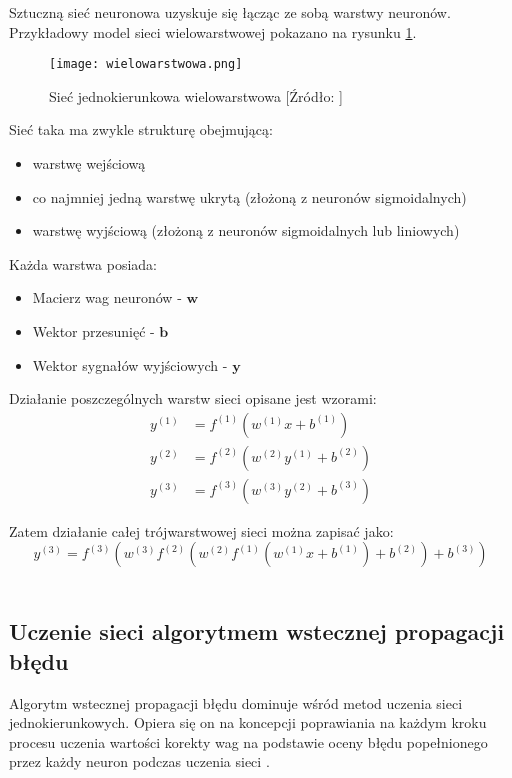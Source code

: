 \documentclass[12pt,twoside]{article}
\begin{document}
Sztuczną sieć neuronowa uzyskuje się łącząc ze sobą warstwy neuronów. Przykładowy model sieci wielowarstwowej pokazano na rysunku \ref{wielo}.

\begin{figure}[h]
\label{wielo}
\centering
\texttt{[image: wielowarstwowa.png]}
\caption{Sieć jednokierunkowa wielowarstwowa	[Źródło: \cite{zajdel1}]}
\end{figure}

Sieć taka ma zwykle strukturę obejmującą: 
\begin{itemize}
\item warstwę wejściową
\item co najmniej jedną warstwę ukrytą (złożoną z neuronów sigmoidalnych)
\item warstwę wyjściową (złożoną z neuronów sigmoidalnych lub liniowych)
\end{itemize}

Każda warstwa posiada:
\begin{itemize}
\item Macierz wag neuronów - $\textbf{w}$
\item Wektor przesunięć - $\textbf{b}$
\item Wektor sygnałów wyjściowych - $\textbf{y}$
\end{itemize}

Działanie poszczególnych warstw sieci opisane jest wzorami:
\begin{equation}\label{warstwy}
\begin{aligned}
y^{(1)} &= f^{(1)}(w^{(1)}x + b^{(1)})\\
y^{(2)} &= f^{(2)}(w^{(2)}y^{(1)} + b^{(2)})\\
y^{(3)} &= f^{(3)}(w^{(3)}y^{(2)} + b^{(3)})
\end{aligned}
\end{equation}

Zatem działanie całej trójwarstwowej sieci można zapisać jako:
\begin{equation}
y^{(3)} = f^{(3)}\left( w^{(3)} f^{(2)} \left( w^{(2)}f^{(1)} \left( w^{(1)}x + b^{(1)}\right) + b^{(2)} \right) + b^{(3)} \right)
\end{equation}
\\


\subsection{Uczenie sieci algorytmem wstecznej propagacji błędu}

Algorytm wstecznej propagacji błędu dominuje wśród metod uczenia sieci jednokierunkowych. Opiera się on na koncepcji poprawiania na każdym kroku procesu uczenia wartości korekty wag na podstawie oceny błędu popełnionego przez każdy neuron podczas uczenia sieci \cite{leksykon}. 
\end{document}
